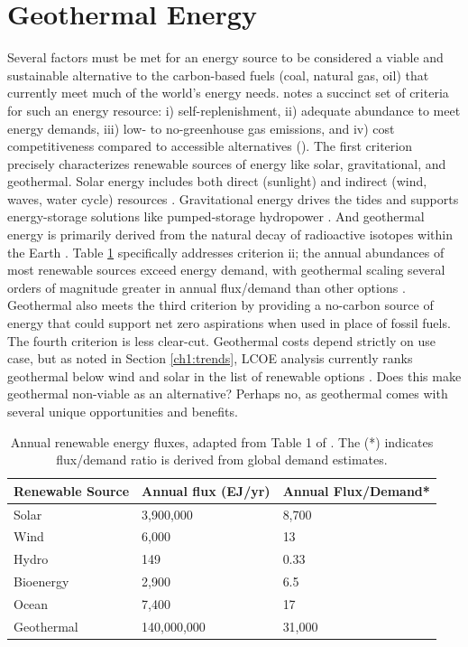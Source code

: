 \section{Geothermal Energy}\label{ch1:geothermal}
Several factors must be met for an energy source to be considered a viable and sustainable alternative to the carbon-based fuels (coal, natural gas, oil) that currently meet much of the world’s energy needs.
\citeauthor{glassley_geothermal_2015} notes a succinct set of criteria for such an energy resource: i) self-replenishment, ii) adequate abundance to meet energy demands, iii) low- to no-greenhouse gas emissions, and iv) cost competitiveness compared to accessible alternatives (\citeyear[p.\ 7]{glassley_geothermal_2015}). The first criterion precisely characterizes renewable sources of energy like solar, gravitational, and geothermal. Solar energy includes both direct (sunlight) and indirect (wind, waves, water cycle) resources \citep{hohmeyer_ipcc_2008}. Gravitational energy drives the tides and supports energy-storage solutions like pumped-storage hydropower \citep{eere_pumped-storage_2021,hohmeyer_ipcc_2008}. And geothermal energy is primarily derived from the natural decay of radioactive isotopes within the Earth \citep{hohmeyer_ipcc_2008}. Table \ref{tab:renewableflux} specifically addresses criterion ii; the annual abundances of most renewable sources exceed energy demand, with geothermal scaling several orders of magnitude greater in annual flux/demand than other options \citep{hohmeyer_ipcc_2008}. Geothermal also meets the third criterion by providing a no-carbon source of energy that could support net zero aspirations when used in place of fossil fuels. The fourth criterion is less clear-cut. Geothermal costs depend strictly on use case, but as noted in Section \ref{ch1:trends}, LCOE analysis currently ranks geothermal below wind and solar in the list of renewable options \citep{lazard_lazards_2020}. Does this make geothermal non-viable as an alternative? Perhaps no, as geothermal comes with several unique opportunities and benefits.

\begin{table}[h!]
\centering
\begin{tabular}{|l|l|l|}
\hline
\textbf{Renewable Source} & \textbf{Annual flux (EJ/yr)} & \textbf{Annual Flux/Demand*} \\ \hline
Solar      & 3,900,000   & 8,700  \\ \hline
Wind       & 6,000       & 13     \\ \hline
Hydro      & 149         & 0.33   \\ \hline
Bioenergy  & 2,900       & 6.5    \\ \hline
Ocean      & 7,400       & 17     \\ \hline
Geothermal & 140,000,000 & 31,000 \\ \hline
\end{tabular}
\caption[Annual renewable energy fluxes]{Annual renewable energy fluxes, adapted from Table 1 of \protect\citep{hohmeyer_ipcc_2008}. The (*) indicates flux/demand ratio is derived from global demand estimates.}
\label{tab:renewableflux}
\end{table}

